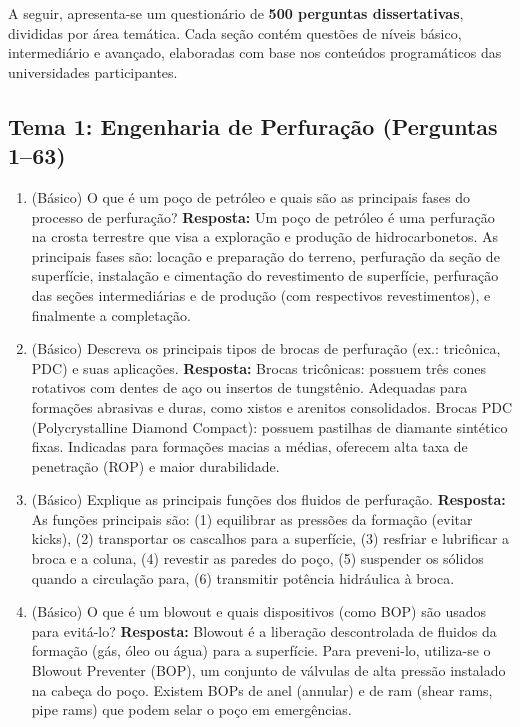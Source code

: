 \documentclass[11pt,a4paper]{article}
\begin{document}
A seguir, apresenta-se um questionário de \textbf{500 perguntas dissertativas}, divididas por área temática. Cada seção contém questões de níveis básico, intermediário e avançado, elaboradas com base nos conteúdos programáticos das universidades participantes.

\newpage

\subsection*{Tema 1: Engenharia de Perfuração (Perguntas 1–63)}

\begin{enumerate}
  \item (Básico) O que é um poço de petróleo e quais são as principais fases do processo de perfuração?
  \textbf{Resposta:} Um poço de petróleo é uma perfuração na crosta terrestre que visa a exploração e produção de hidrocarbonetos. As principais fases são: locação e preparação do terreno, perfuração da seção de superfície, instalação e cimentação do revestimento de superfície, perfuração das seções intermediárias e de produção (com respectivos revestimentos), e finalmente a completação.

  \item (Básico) Descreva os principais tipos de brocas de perfuração (ex.: tricônica, PDC) e suas aplicações.
  \textbf{Resposta:} Brocas tricônicas: possuem três cones rotativos com dentes de aço ou insertos de tungstênio. Adequadas para formações abrasivas e duras, como xistos e arenitos consolidados. Brocas PDC (Polycrystalline Diamond Compact): possuem pastilhas de diamante sintético fixas. Indicadas para formações macias a médias, oferecem alta taxa de penetração (ROP) e maior durabilidade.

  \item (Básico) Explique as principais funções dos fluidos de perfuração.
  \textbf{Resposta:} As funções principais são: (1) equilibrar as pressões da formação (evitar kicks), (2) transportar os cascalhos para a superfície, (3) resfriar e lubrificar a broca e a coluna, (4) revestir as paredes do poço, (5) suspender os sólidos quando a circulação para, (6) transmitir potência hidráulica à broca.

  \item (Básico) O que é um blowout e quais dispositivos (como BOP) são usados para evitá-lo?
  \textbf{Resposta:} Blowout é a liberação descontrolada de fluidos da formação (gás, óleo ou água) para a superfície. Para preveni-lo, utiliza-se o Blowout Preventer (BOP), um conjunto de válvulas de alta pressão instalado na cabeça do poço. Existem BOPs de anel (annular) e de ram (shear rams, pipe rams) que podem selar o poço em emergências.


\end{enumerate}
\end{document}

